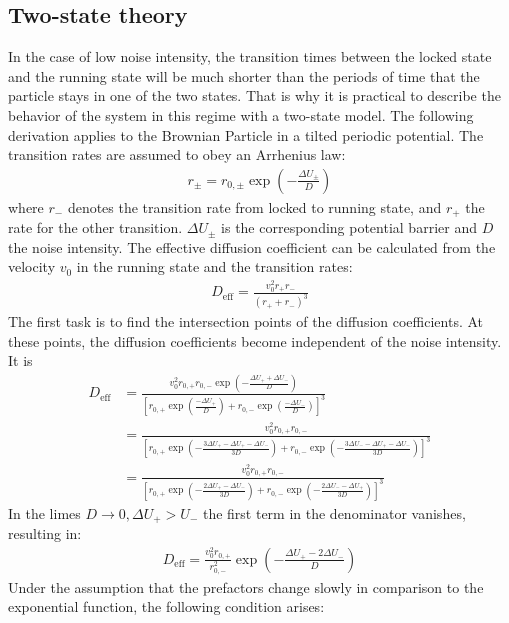 \documentclass[12pt,a4paper]{article}
\begin{document}
\subsection{Two-state theory}\label{tst}
In the case of low noise intensity, the transition times between the locked state and the running state will be much shorter than the periods of time that the particle stays in one of the two states. That is why it is practical to describe the behavior of the system in this regime with a two-state model. The following derivation applies to the Brownian Particle in a tilted periodic potential. The transition rates are assumed to obey an Arrhenius law:
\begin{align*}
r_{\pm}=r_{0,\pm}\exp\left(-\frac{\Delta U_{\pm}}{D}\right)
\end{align*}
where $r_-$ denotes the transition rate from locked to running state, and $r_+$ the rate for the other transition. $\Delta U_{\pm}$ is the corresponding potential barrier and $D$ the noise intensity. The effective diffusion coefficient can be calculated from the velocity $v_0$ in the running state and the transition rates: 
\begin{align*}
D_{\text{eff}}=\frac{v_0^2 r_+r_-}{(r_++r_-)^3}
\end{align*}
The first task is to find the intersection points of the diffusion coefficients. At these points, the diffusion coefficients become independent of the noise intensity.
It is
\begin{align*}
D_{\text{eff}}&=\frac{v_0^2r_{0,+}r_{0,-}\exp\left(-\frac{\Delta U_++\Delta U_-}{D}\right)}{\left[r_{0,+}\exp(\frac{-\Delta U_+}{D})+r_{0,-}\exp\left(\frac{-\Delta U_-}{D}\right)\right]^3}\\&=\frac{v_0^2r_{0,+}r_{0,-}}{\left[r_{0,+}\exp\left(-\frac{3\Delta U_+-\Delta U_+-\Delta U_-}{3D}\right)+r_{0,-}\exp\left(-\frac{3\Delta U_--\Delta U_+ -\Delta U_-}{3D}\right)\right]^3}\\&=\frac{v_0^2r_{0,+}r_{0,-}}{\left[r_{0,+}\exp\left(-\frac{2\Delta U_+-\Delta U_-}{3D}\right)+r_{0,-}\exp\left(-\frac{2\Delta U_--\Delta U_+}{3D}\right)\right]^3}
\end{align*}
In the limes $D\rightarrow 0,\Delta U_+>U_-$ the first term in the denominator vanishes, resulting in:
\begin{align*}
D_{\text{eff}}=\frac{v_0^2r_{0,+}}{r_{0,-}^2}\exp\left(-\frac{\Delta U_+-2\Delta U_-}{D}\right)
\end{align*}
Under the assumption that the prefactors change slowly in comparison to the exponential function, the following condition arises:
\end{document}
